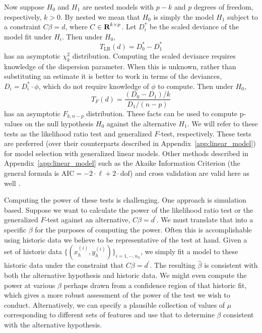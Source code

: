 \documentclass[12pt]{article}
\begin{document}
Now suppose $H_0$ and $H_1$ are nested models with $p-k$ and $p$ degrees of freedom, respectively, $k > 0$. By nested we mean that $H_0$ is simply the model $H_1$ subject to a constraint $C \beta = d$, where $C \in {\mbox{\bf R}}^{k\times p}$. Let $D_i^*$ be the scaled deviance of the model fit under $H_i$. Then under $H_0$,
\begin{displaymath}
   T_{\textrm{LR}}(d) = D_0^* - D_1^*
\end{displaymath}
has an asymptotic $\chi_{k}^2$ distribution. Computing the scaled deviance requires knowledge of the dispersion parameter. When this is unknown, rather than substituting an estimate it is better to work in terms of the deviances, $D_i = D_i^* \cdot \phi$, which do not require knowledge of $\phi$ to compute. Then under $H_0$,
\begin{displaymath}
   T_F(d) = \frac{(D_0 - D_1) / k}{D_1 / (n - p)}
\end{displaymath}
has an asymptotic $F_{k, n-p}$ distribution. These facts can be used to compute p-values on the null hypothesis $H_0$ against the alternative $H_1$. We will refer to these tests as the likelihood ratio test and generalized $F$-test, respectively. These tests are preferred (over their counterparts described in Appendix~\ref{app:linear_model}) for model selection with generalized linear models. Other methods described in Appendix~\ref{app:linear_model} such as the Akaike Information Criterion (the general formula is $\textrm{AIC} = -2 \cdot \ell + 2 \cdot \textrm{dof}$) and cross validation are valid here as well \cite[\S 3.1.4]{Wood:2017}.

Computing the power of these tests is challenging. One approach is simulation based. Suppose we want to calculate the power of the likelihood ratio test or  the generalized $F$-test against an alternative, $C \beta = d^\prime$. We must translate that into a specific $\beta$ for the purposes of computing the power. Often this is accomplishable using historic data we believe to be representative of the test at hand. Given a set of historic data $\{ (x_h^{(i)}, y_h^{(i)}) \}_{i=1, \cdots, n_h}$, we simply fit a model to these historic data under the constraint that $C \beta = d^\prime$. The resulting $\hat{\beta}$ is consistent with both the alternative hypothesis and historic data. We might even compute the power at various $\beta$ perhaps drawn from a confidence region of that historic fit, which gives a more robust assessment of the power of the test we wish to conduct. Alternatively, we can specify a plausible collection of values of $\mu$ corresponding to different sets of features and use that to determine $\beta$ consistent with the alternative hypothesis.
\end{document}
